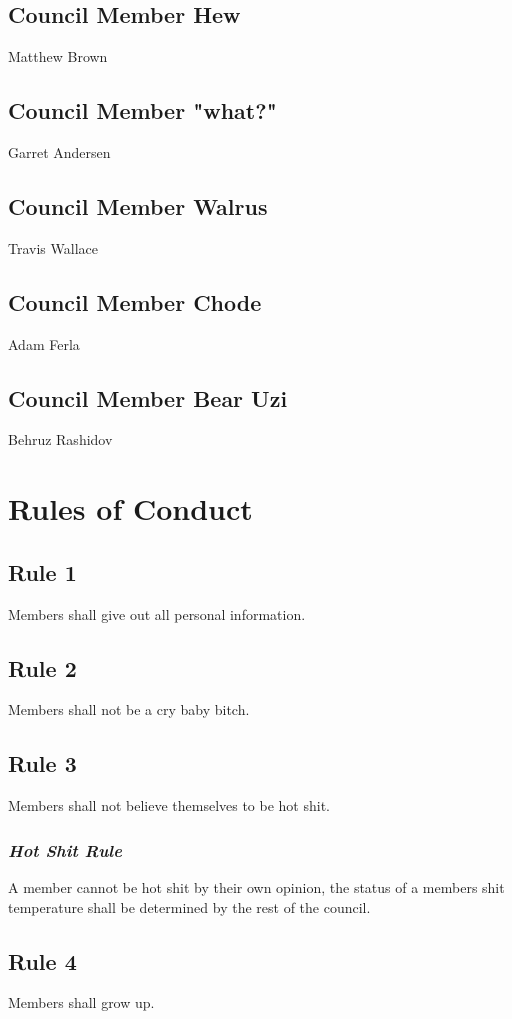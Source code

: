 \documentclass[letterpaper]{article}
\begin{document}
	\subsection{Council Member Hew}
	\label{subsec:matt}
		Matthew Brown
	\subsection{Council Member "what?"}
	\label{subsec:gary}
		Garret Andersen
	\subsection{Council Member Walrus}
	\label{subsec:travis}
		Travis Wallace
	\subsection{Council Member Chode}
	\label{subsec:adam}
		Adam Ferla
	\subsection{Council Member Bear Uzi}
		Behruz Rashidov
		
	
\newpage
\section{Rules of Conduct}
\label{sec:rulesConduct}

\subsection{Rule 1}
Members shall give out all personal information.

\subsection{Rule 2}
Members shall not be a cry baby bitch.

\subsection{Rule 3}
Members shall not believe themselves to be hot shit.
\subsubsection{\textit{Hot Shit Rule}}
A member cannot be hot shit by their own opinion, the status of a members shit temperature shall be determined by the rest of the council.

\subsection{Rule 4}
Members shall grow up.
\end{document}
